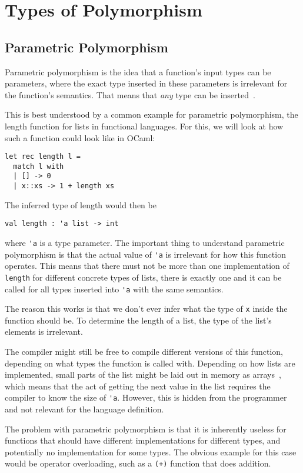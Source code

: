 \section{Types of Polymorphism}

\subsection{Parametric Polymorphism}

Parametric polymorphism is the idea that a function's input types can be parameters, where the exact type inserted in these parameters is irrelevant for the function's semantics. That means that \textit{any} type can be inserted~\cite[Chapter~23.2]{pierce-types}.

This is best understood by a common example for parametric polymorphism, the length function for lists in functional languages. For this, we will look at how such a function could look like in OCaml:
\begin{verbatim}
let rec length l =
  match l with
  | [] -> 0
  | x::xs -> 1 + length xs
\end{verbatim}
The inferred type of length would then be
\begin{verbatim}
val length : 'a list -> int
\end{verbatim}
where \verb|'a| is a type parameter. The important thing to understand parametric polymorphism is that the actual value of \verb|'a| is irrelevant for how this function operates. This means that there must not be more than one implementation of \verb|length| for different concrete types of lists, there is exactly one and it can be called for all types inserted into \verb|'a| with the same semantics.

The reason this works is that we don't ever infer what the type of \verb|x| inside the function should be. To determine the length of a list, the type of the list's elements is irrelevant.

The compiler might still be free to compile different versions of this function, depending on what types the function is called with. Depending on how lists are implemented, small parts of the list might be laid out in memory as arrays~\cite{functional-lists}, which means that the act of getting the next value in the list requires the compiler to know the size of \verb|'a|. However, this is hidden from the programmer and not relevant for the language definition.

The problem with parametric polymorphism is that it is inherently useless for functions that should have different implementations for different types, and potentially no implementation for some types. The obvious example for this case would be operator overloading, such as a \verb|(+)| function that does addition.

